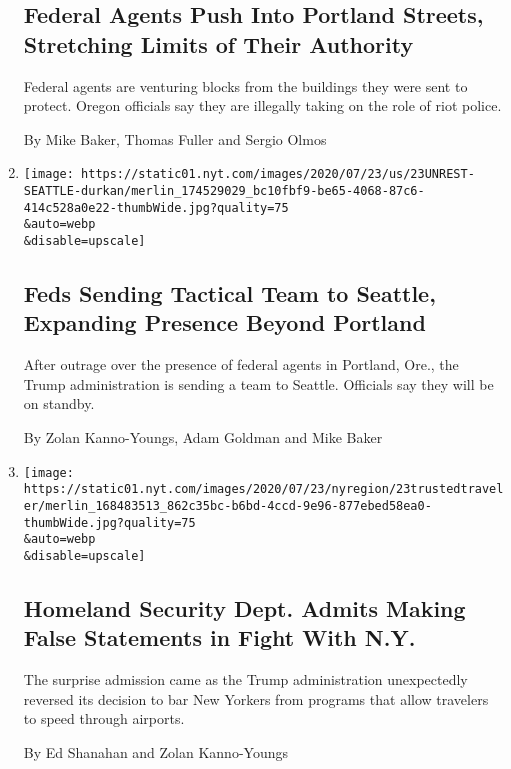 \begin{enumerate}
  \hypertarget{federal-agents-push-into-portland-streets-stretching-limits-of-their-authority}{%
  \subsection{Federal Agents Push Into Portland Streets, Stretching
  Limits of Their
  Authority}\label{federal-agents-push-into-portland-streets-stretching-limits-of-their-authority}}

  Federal agents are venturing blocks from the buildings they were sent
  to protect. Oregon officials say they are illegally taking on the role
  of riot police.

  By Mike Baker, Thomas Fuller and Sergio Olmos
\item
  \href{/2020/07/23/us/seattle-protests-feds.html}{}

  \texttt{[image: https://static01.nyt.com/images/2020/07/23/us/23UNREST-SEATTLE-durkan/merlin\_174529029\_bc10fbf9-be65-4068-87c6-414c528a0e22-thumbWide.jpg?quality=75\\\&auto=webp\\\&disable=upscale]}

  \hypertarget{feds-sending-tactical-team-to-seattle-expanding-presence-beyond-portland}{%
  \subsection{Feds Sending Tactical Team to Seattle, Expanding Presence
  Beyond
  Portland}\label{feds-sending-tactical-team-to-seattle-expanding-presence-beyond-portland}}

  After outrage over the presence of federal agents in Portland, Ore.,
  the Trump administration is sending a team to Seattle. Officials say
  they will be on standby.

  By Zolan Kanno-Youngs, Adam Goldman and Mike Baker
\item
  \href{/2020/07/23/nyregion/trusted-traveler-homeland-security.html}{}

  \texttt{[image: https://static01.nyt.com/images/2020/07/23/nyregion/23trustedtraveler/merlin\_168483513\_862c35bc-b6bd-4ccd-9e96-877ebed58ea0-thumbWide.jpg?quality=75\\\&auto=webp\\\&disable=upscale]}

  \hypertarget{homeland-security-dept-admits-making-false-statements-in-fight-with-ny}{%
  \subsection{Homeland Security Dept. Admits Making False Statements in
  Fight With
  N.Y.}\label{homeland-security-dept-admits-making-false-statements-in-fight-with-ny}}

  The surprise admission came as the Trump administration unexpectedly
  reversed its decision to bar New Yorkers from programs that allow
  travelers to speed through airports.

  By Ed Shanahan and Zolan Kanno-Youngs
\end{enumerate}

